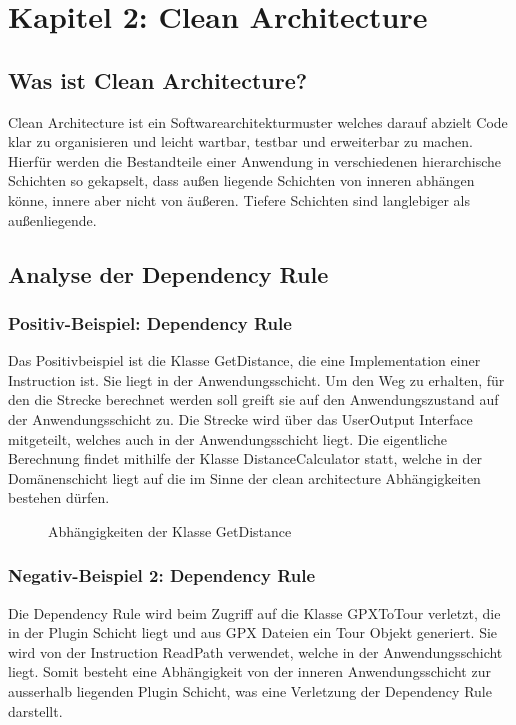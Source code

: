 \section{Kapitel 2: Clean Architecture}

\subsection{Was ist Clean Architecture?}

Clean Architecture ist ein Softwarearchitekturmuster welches darauf abzielt Code klar zu organisieren und leicht wartbar, testbar und erweiterbar zu machen.
Hierfür werden die Bestandteile einer Anwendung in verschiedenen hierarchische Schichten so gekapselt, dass außen liegende Schichten von inneren abhängen könne, innere aber nicht von äußeren. Tiefere Schichten sind langlebiger als außenliegende.


\subsection{Analyse der Dependency Rule} %

\subsubsection{Positiv-Beispiel: Dependency Rule}

Das Positivbeispiel ist die Klasse GetDistance, die eine Implementation einer Instruction ist. Sie liegt in der Anwendungsschicht. Um den Weg zu erhalten, für den die Strecke berechnet werden soll greift sie auf den Anwendungszustand auf der Anwendungsschicht zu. Die Strecke wird über das UserOutput Interface mitgeteilt, welches auch in der Anwendungsschicht liegt. Die eigentliche Berechnung findet mithilfe der Klasse DistanceCalculator statt, welche in der Domänenschicht liegt auf die im Sinne der clean architecture Abhängigkeiten bestehen dürfen.

\begin{figure}[H]
  \centering
  
  \caption{Abhängigkeiten der Klasse GetDistance}
\end{figure}


\subsubsection{Negativ-Beispiel 2: Dependency Rule}

Die Dependency Rule wird beim Zugriff auf die Klasse GPXToTour verletzt, die in der Plugin Schicht liegt und aus GPX Dateien ein Tour Objekt generiert. Sie wird von der Instruction ReadPath verwendet, welche in der Anwendungsschicht liegt. Somit besteht eine Abhängigkeit von der inneren Anwendungsschicht zur ausserhalb liegenden Plugin Schicht, was eine Verletzung der Dependency Rule darstellt.

